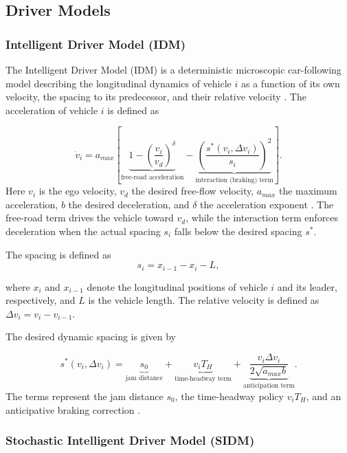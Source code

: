 \subsection{Driver Models}
\subsubsection{Intelligent Driver Model (IDM)}

The Intelligent Driver Model (IDM) is a deterministic microscopic car-following model describing the longitudinal dynamics of vehicle $i$ as a function of its own velocity, the spacing to its predecessor, and their relative velocity \cite{Treiber.2000}. The acceleration of vehicle $i$ is defined as

\begin{equation}
	\dot{v}_i =
	a_{max} \left[
	\underbrace{1 - \left( \frac{v_i}{v_d} \right)^{\delta}}_{\text{free-road acceleration}}
	-
	\underbrace{\left( \frac{s^*(v_i,\Delta v_i)}{s_i} \right)^2}_{\text{interaction (braking) term}}
	\right].
\end{equation}
Here $v_i$ is the ego velocity, $v_d$ the desired free-flow velocity, $a_{max}$ the maximum acceleration, $b$ the desired deceleration, and $\delta$ the acceleration exponent \cite{Treiber.2000}. The free-road term drives the vehicle toward $v_d$, while the interaction term enforces deceleration when the actual spacing $s_i$ falls below the desired spacing $s^*$.


The spacing is defined as
\begin{equation}
	s_i = x_{i-1} - x_i - L,
\end{equation}

where $x_i$ and $x_{i-1}$ denote the longitudinal positions of vehicle $i$ and its leader, respectively, and $L$ is the vehicle length. The relative velocity is defined as $\Delta v_i = v_i - v_{i-1}$.

The desired dynamic spacing is given by

\begin{equation}
	s^*(v_i,\Delta v_i)
	=
	\underbrace{s_0}_{\text{jam distance}}
	+
	\underbrace{v_i T_H}_{\text{time-headway term}}
	+
	\underbrace{\frac{v_i \Delta v_i}{2 \sqrt{a_{max} b}}}_{\text{anticipation term}}.
\end{equation}
The terms represent the jam distance $s_0$, the time-headway policy $v_i T_H$, and an anticipative braking correction \cite{Treiber.2000}.


\subsubsection{Stochastic Intelligent Driver Model (SIDM)} \label{SIDM}

